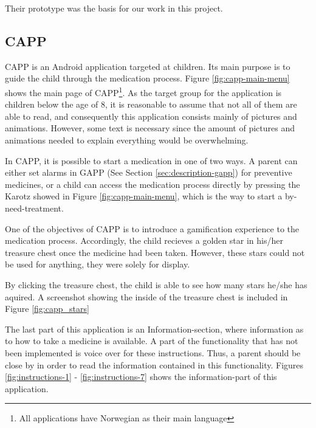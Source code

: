 Their prototype was the basis for our work in this project. 


\subsection{CAPP}
\label{sec:description-capp}
CAPP is an Android application targeted at children. Its main purpose is to guide the child through the medication process. Figure \ref{fig:capp-main-menu} shows the main page of CAPP\footnote{All applications have Norwegian as their main language}.  
As the target group for the application is children below the age of 8, it is reasonable to assume that not all of them are able to read, and consequently this application consists mainly of pictures and animations. However, some text is necessary since the amount of pictures and animations needed to explain everything would be overwhelming.


In CAPP, it is possible to start a medication in one of two ways. A parent can either set alarms in GAPP (See Section \ref{sec:description-gapp}) for preventive medicines, or a child can access the medication process directly by pressing the Karotz showed in Figure \ref{fig:capp-main-menu}, which is the way to start a by-need-treatment. 


One of the objectives of CAPP is to introduce a gamification experience to the medication process. Accordingly, the child recieves a golden star in his/her treasure chest once the medicine had been taken. However, these stars could not be used for anything, they were solely for display.
  

By clicking the treasure chest, the child is able to see how many stars he/she has aquired. A screenshot showing the inside of the treasure chest is included in Figure \ref{fig:capp_stars} 


The last part of this application is an Information-section, where information as to how to take a medicine is available. A part of the functionality that has not been implemented is voice over for these instructions. Thus, a parent should be close by in order to read the information contained in this functionality.     
Figures \ref{fig:instructions-1} - \ref{fig:instructions-7} shows the information-part of this application.



